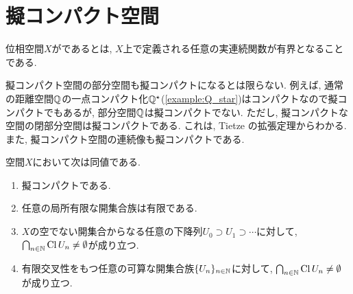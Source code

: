 \documentclass[uplatex, dvipdfmx, a4paper, 12pt, class=jsbook, crop=false]{standalone}
\begin{document}
\section{擬コンパクト空間}
\label{sec:pseudo-compact-spaces}

\begin{definition}
	位相空間$ X $がであるとは, $ X $上で定義される任意の実連続関数が有界となることである.
\end{definition}

擬コンパクト空間の部分空間も擬コンパクトになるとは限らない. 例えば, 通常の距離空間$ \mathbb{Q} $の一点コンパクト化$ \mathbb{Q}^\star $(\ref{example:Q_star})はコンパクトなので擬コンパクトでもあるが, 部分空間$ \mathbb{Q} $は擬コンパクトでない. ただし, 擬コンパクトな  空間の閉部分空間は擬コンパクトである. これは, Tietze の拡張定理からわかる. また, 擬コンパクト空間の連続像も擬コンパクトである.

\begin{proposition}
	 空間$ X $において次は同値である.
	\begin{enumerate}
		\item 擬コンパクトである.
		\item 任意の局所有限な開集合族は有限である.
		\item $ X $の空でない開集合からなる任意の下降列$ U_0 \supset U_1 \supset \cdots $に対して, $ \bigcap_{n \in \mathbb{N}} \mathop{\mathrm{Cl}}\nolimits U_n \neq \emptyset $が成り立つ.
		\item 有限交叉性をもつ任意の可算な開集合族$ \{U_n\}_{n \in \mathbb{N}} $に対して,  $ \bigcap_{n \in \mathbb{N}} \mathop{\mathrm{Cl}}\nolimits U_n \neq \emptyset $が成り立つ.
	\end{enumerate}
\end{proposition}
\end{document}
